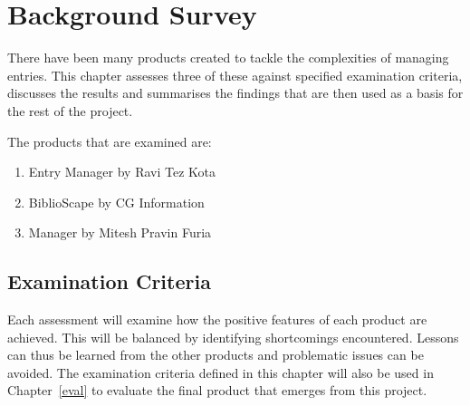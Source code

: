 \chapter{Background Survey}
\label{backgrnd}
There have been many products created to tackle the complexities of managing \bibtex{} entries.  This chapter assesses three of these against specified examination criteria, discusses the results and summarises the findings that are then used as a basis for the rest of the project.

The products that are examined are:
\begin{enumerate}
	\item \bibtex{} Entry Manager by Ravi Tez Kota
	\item BiblioScape by CG Information
	\item \bibtex{} Manager by Mitesh Pravin Furia 
\end{enumerate}

\section{Examination Criteria}
\label{examCriteria}
Each assessment will examine how the positive features of each product are achieved. This will be balanced by identifying shortcomings encountered.  Lessons can thus be learned from the other products and problematic issues can be avoided.  The examination criteria defined in this chapter will also be used in Chapter~\ref{eval} to evaluate the final product that emerges from this project.


